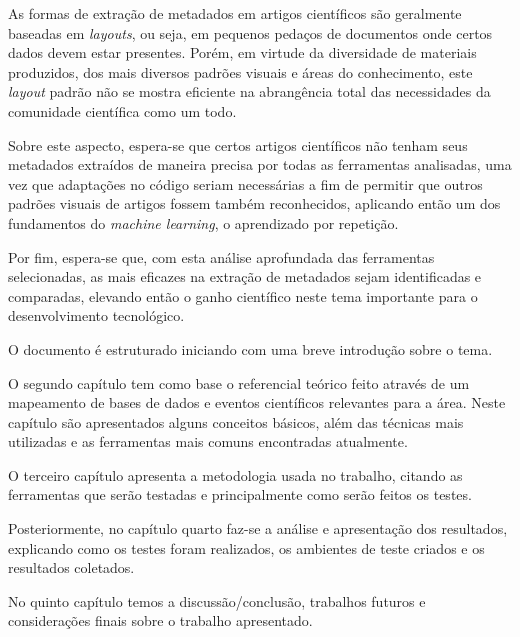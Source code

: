 As formas de extração de metadados em artigos científicos são geralmente baseadas em \textit{layouts}, ou seja, em pequenos pedaços de documentos onde certos dados devem estar presentes. Porém, em virtude da diversidade de materiais produzidos, dos mais diversos padrões visuais e áreas do conhecimento, este \textit{layout} padrão não se mostra eficiente na abrangência total das necessidades da comunidade científica como um todo. 

Sobre este aspecto, espera-se que certos artigos científicos não tenham seus metadados extraídos de maneira precisa por todas as ferramentas analisadas, uma vez que adaptações no código seriam necessárias a fim de permitir que outros padrões visuais de artigos fossem também reconhecidos, aplicando então um dos fundamentos do \textit{machine learning}, o aprendizado por repetição. 

Por fim, espera-se que, com esta análise aprofundada das ferramentas selecionadas, as mais eficazes na extração de metadados sejam identificadas e comparadas, elevando então o ganho científico neste tema importante para o desenvolvimento tecnológico.

O documento é estruturado iniciando com uma breve introdução sobre o tema.

O segundo capítulo tem como base o referencial teórico feito através de um mapeamento de bases de dados e eventos científicos relevantes para a área. Neste capítulo são apresentados alguns conceitos básicos, além das técnicas mais utilizadas e as ferramentas mais comuns encontradas atualmente.

O terceiro capítulo apresenta a metodologia usada no trabalho, citando as ferramentas que serão testadas e principalmente como serão feitos os testes. 

Posteriormente, no capítulo quarto faz-se a análise e apresentação dos resultados, explicando como os testes foram realizados, os ambientes de teste criados e os resultados coletados.

No quinto capítulo temos a discussão/conclusão, trabalhos futuros e considerações finais sobre o trabalho apresentado.



